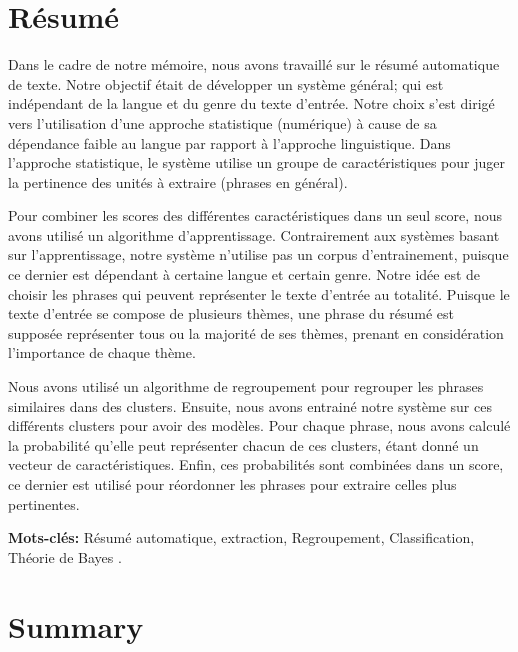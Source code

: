 \documentclass[a4paper,12pt,oneside]{../use/ESIthesis}
\begin{document}
  	 	
  	 	\frontmatter
  \fi

\chapter*{Résumé}

Dans le cadre de notre mémoire, nous avons travaillé sur le résumé automatique de texte. 
Notre objectif était de développer un système général; qui est indépendant de la langue et du genre du texte d'entrée. 
Notre choix s'est dirigé vers l'utilisation d'une approche statistique (numérique) à cause de sa dépendance faible au langue par rapport à l'approche linguistique. 
Dans l'approche statistique, le système utilise un groupe de caractéristiques pour juger la pertinence des unités à extraire (phrases en général). 

Pour combiner les scores des différentes caractéristiques dans un seul score, nous avons utilisé un algorithme d'apprentissage. 
Contrairement aux systèmes basant sur l'apprentissage, notre système n'utilise pas un corpus d'entrainement, puisque ce dernier est dépendant à certaine langue et certain genre. 
Notre idée est de choisir les phrases qui peuvent représenter le texte d'entrée au totalité. 
Puisque le texte d'entrée se compose de plusieurs thèmes, une phrase du résumé est supposée représenter tous ou la majorité de ses thèmes, prenant en considération l'importance de chaque thème. 

Nous avons utilisé un algorithme de regroupement pour regrouper les phrases similaires dans des clusters. 
Ensuite, nous avons entrainé notre système sur ces différents clusters pour avoir des modèles. 
Pour chaque phrase, nous avons calculé la probabilité qu'elle peut représenter chacun de ces clusters, étant donné un vecteur de caractéristiques. 
Enfin, ces probabilités sont combinées dans un score, ce dernier est utilisé pour réordonner les phrases pour extraire celles plus pertinentes.

\vspace*{\fill}

\textbf{Mots-clés: }
Résumé automatique, 
extraction, 
Regroupement, 
Classification, 
Théorie de Bayes
.

\clearpage

\chapter*{Summary}
\end{document}
